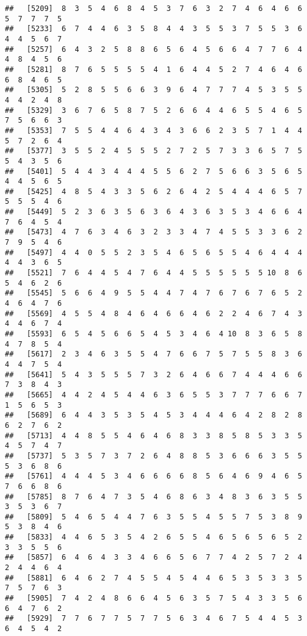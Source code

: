\documentclass[
]{book}
\begin{document}
\begin{verbatim}
##   [5209]  8  3  5  4  6  8  4  5  3  7  6  3  2  7  4  6  4  6  6  5  7  7  7  5
##   [5233]  6  7  4  4  6  3  5  8  4  4  3  5  5  3  7  5  5  3  6  4  4  5  6  7
##   [5257]  6  4  3  2  5  8  8  6  5  6  4  5  6  6  4  7  7  6  4  4  8  4  5  6
##   [5281]  8  7  6  5  5  5  5  4  1  6  4  4  5  2  7  4  6  4  6  6  8  4  6  5
##   [5305]  5  2  8  5  5  6  6  3  9  6  4  7  7  7  4  5  3  5  5  4  4  2  4  8
##   [5329]  3  6  7  6  5  8  7  5  2  6  6  4  4  6  5  5  4  6  5  7  5  6  6  3
##   [5353]  7  5  5  4  4  6  4  3  4  3  6  6  2  3  5  7  1  4  4  5  7  2  6  4
##   [5377]  3  5  5  2  4  5  5  5  2  7  2  5  7  3  3  6  5  7  5  5  4  3  5  6
##   [5401]  5  4  4  3  4  4  4  5  5  6  2  7  5  6  6  3  5  6  5  4  4  5  6  5
##   [5425]  4  8  5  4  3  3  5  6  2  6  4  2  5  4  4  4  6  5  7  5  5  5  4  6
##   [5449]  5  2  3  6  3  5  6  3  6  4  3  6  3  5  3  4  6  6  4  7  6  4  5  4
##   [5473]  4  7  6  3  4  6  3  2  3  3  4  7  4  5  5  3  3  6  2  7  9  5  4  6
##   [5497]  4  4  0  5  5  2  3  5  4  6  5  6  5  5  4  6  4  4  4  4  4  3  6  5
##   [5521]  7  6  4  4  5  4  7  6  4  4  5  5  5  5  5  5 10  8  6  5  4  6  2  6
##   [5545]  5  6  6  4  9  5  5  4  4  7  4  7  6  7  6  7  6  5  2  4  6  4  7  6
##   [5569]  4  5  5  4  8  4  6  4  6  6  4  6  2  2  4  6  7  4  3  4  4  6  7  4
##   [5593]  6  5  4  5  6  6  5  4  5  3  4  6  4 10  8  3  6  5  8  4  7  8  5  4
##   [5617]  2  3  4  6  3  5  5  4  7  6  6  7  5  7  5  5  8  3  6  4  4  7  5  4
##   [5641]  5  4  3  5  5  5  7  3  2  6  4  6  6  7  4  4  4  6  6  7  3  8  4  3
##   [5665]  4  4  2  4  5  4  4  6  3  6  5  5  3  7  7  7  6  6  7  1  5  6  5  3
##   [5689]  6  4  4  3  5  3  5  4  5  3  4  4  4  6  4  2  8  2  8  6  2  7  6  2
##   [5713]  4  4  8  5  5  4  6  4  6  8  3  3  8  5  8  5  3  3  5  4  5  7  4  7
##   [5737]  5  3  5  7  3  7  2  6  4  8  8  5  3  6  6  6  3  5  5  5  3  6  8  6
##   [5761]  4  4  4  5  3  4  6  6  6  6  8  5  6  4  6  9  4  6  5  7  6  6  8  6
##   [5785]  8  7  6  4  7  3  5  4  6  8  6  3  4  8  3  6  3  5  5  3  5  3  6  7
##   [5809]  5  4  6  5  4  4  7  6  3  5  5  4  5  5  7  5  3  8  9  5  3  8  4  6
##   [5833]  4  4  6  5  3  5  4  2  6  5  5  4  6  5  6  5  6  5  2  3  3  5  5  6
##   [5857]  6  4  6  4  3  3  4  6  6  5  6  7  7  4  2  5  7  2  4  2  4  4  6  4
##   [5881]  6  4  6  2  7  4  5  5  4  5  4  4  6  5  3  5  3  3  5  7  5  7  6  3
##   [5905]  7  4  2  4  8  6  6  4  5  6  3  5  7  5  4  3  3  5  6  6  4  7  6  2
##   [5929]  7  7  6  7  7  5  7  7  5  6  3  4  6  7  5  4  4  5  3  6  4  5  4  2

\end{verbatim}
\end{document}
